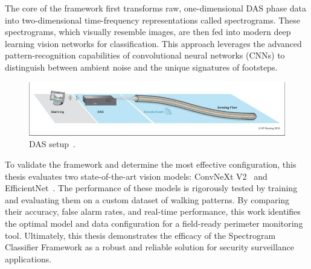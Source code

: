 The core of the framework first transforms raw, one-dimensional DAS phase data into two-dimensional time-frequency representations called spectrograms. These spectrograms, which visually resemble images, are then fed into modern deep learning vision networks for classification. This approach leverages the advanced pattern-recognition capabilities of convolutional neural networks (CNNs) to distinguish between ambient noise and the unique signatures of footsteps.

\begin{figure}[h]
    \centering
    \includegraphics[width=\linewidth]{Bilder/jpg/System.jpg}
    \caption{DAS setup~\cite{DAS_PPT}.}
    \label{System}
\end{figure}

To validate the framework and determine the most effective configuration, this thesis evaluates two state-of-the-art vision models: ConvNeXt V2~\cite{liu2023convnextv2} and EfficientNet~\cite{tan2019efficientnet}. The performance of these models is rigorously tested by training and evaluating them on a custom dataset of walking patterns. By comparing their accuracy, false alarm rates, and real-time performance, this work identifies the optimal model and data configuration for a field-ready perimeter monitoring tool. Ultimately, this thesis demonstrates the efficacy of the Spectrogram Classifier Framework as a robust and reliable solution for security surveillance applications.